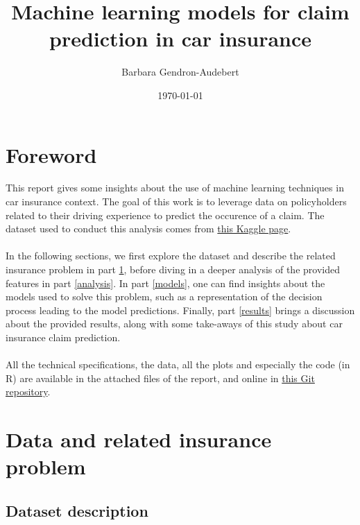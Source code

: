 \documentclass[a4paper,11pt, titlepage]{article}
\title{\Huge{Machine learning models for claim prediction in car insurance}}
\author{\Large{Barbara {\sc Gendron-Audebert}}}
\date\today
\begin{document}
\maketitle
\tableofcontents
\vskip150pt
\section*{Foreword}

This report gives some insights about the use of machine learning techniques in car insurance context. The goal of this work is to leverage data on policyholders related to their driving experience to predict the occurence of a claim. The dataset used to conduct this analysis comes from \href{https://www.kaggle.com/datasets/sagnik1511/car-insurance-data}{this Kaggle page}.\\
\\
In the following sections, we first explore the dataset and describe the related insurance problem in part \ref{data}, before diving in a deeper analysis of the provided features in part \ref{analysis}. In part \ref{models}, one can find insights about the models used to solve this problem, such as a representation of the decision process leading to the model predictions. Finally, part \ref{results} brings a discussion about the provided results, along with some take-aways of this study about car insurance claim prediction.\\
\\
All the technical specifications, the data, all the plots and especially the code (in R) are available in the attached files of the report, and online in \href{https://github.com/B-Gendron/car-insurance-data}{this Git repository}.

\newpage

\section{Data and related insurance problem} \label{data}

\subsection{Dataset description}
\end{document}
